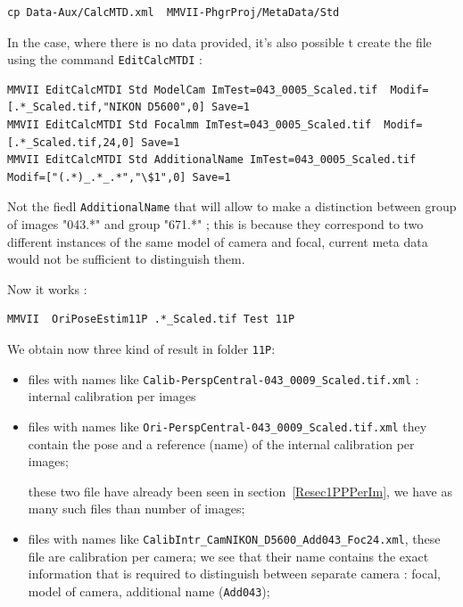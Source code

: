 \begin{lstlisting}
cp Data-Aux/CalcMTD.xml  MMVII-PhgrProj/MetaData/Std
\end{lstlisting}

In the case, where there is no data provided, it's also possible t create the file
using the command {\tt EditCalcMTDI} :

\begin{lstlisting}
MMVII EditCalcMTDI Std ModelCam ImTest=043_0005_Scaled.tif  Modif=[.*_Scaled.tif,"NIKON D5600",0] Save=1
MMVII EditCalcMTDI Std Focalmm ImTest=043_0005_Scaled.tif  Modif=[.*_Scaled.tif,24,0] Save=1
MMVII EditCalcMTDI Std AdditionalName ImTest=043_0005_Scaled.tif  Modif=["(.*)_.*_.*","\$1",0] Save=1
\end{lstlisting}

Not the fiedl {\tt AdditionalName} that will allow to make a distinction between group of
images "043.*" and group "671.*" ; this is because
they correspond to two different instances of the same model of camera and focal, current meta data would
not be sufficient to distinguish them.

Now it works :

\begin{lstlisting}
MMVII  OriPoseEstim11P .*_Scaled.tif Test 11P
\end{lstlisting}

We obtain now three kind of result in folder {\tt 11P}:

\begin{itemize}
	\item files with names like  {\tt Calib-PerspCentral-043\_0009\_Scaled.tif.xml} :  internal calibration per images

	\item files with  names like {\tt Ori-PerspCentral-043\_0009\_Scaled.tif.xml} they contain the pose and
		a reference (name) of the internal calibration per images;

	       these two file have already been seen in section~\ref{Resec1PPPerIm}, we have as many such files
               than number of images;


	\item files with  names like {\tt CalibIntr\_CamNIKON\_D5600\_Add043\_Foc24.xml}, these file  are calibration
              per camera;  we see that their name contains the exact information that is required to distinguish between 
              separate camera : focal, model of camera, additional name ({\tt Add043});

\end{itemize}

